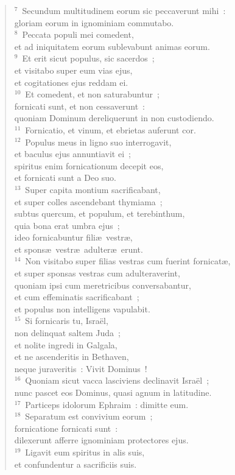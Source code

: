 \begin{verse}
${}^{7}$~Secundum multitudinem eorum sic peccaverunt mihi~:\\ gloriam eorum in ignominiam commutabo.\\
${}^{8}$~Peccata populi mei comedent,\\ et ad iniquitatem eorum sublevabunt animas eorum.\\
${}^{9}$~Et erit sicut populus, sic sacerdos~;\\ et visitabo super eum vias ejus,\\ et cogitationes ejus reddam ei.\\
${}^{10}$~Et comedent, et non saturabuntur~;\\ fornicati sunt, et non cessaverunt~:\\ quoniam Dominum dereliquerunt in non custodiendo.\\
${}^{11}$~Fornicatio, et vinum, et ebrietas auferunt cor.\\
${}^{12}$~Populus meus in ligno suo interrogavit,\\ et baculus ejus annuntiavit ei~;\\ spiritus enim fornicationum decepit eos,\\ et fornicati sunt a Deo suo.\\
${}^{13}$~Super capita montium sacrificabant,\\ et super colles ascendebant thymiama~;\\ subtus quercum, et populum, et terebinthum,\\ quia bona erat umbra ejus~;\\ ideo fornicabuntur fili\ae\ vestr\ae ,\\ et spons\ae\ vestr\ae\ adulter\ae\ erunt.\\
${}^{14}$~Non visitabo super filias vestras cum fuerint fornicat\ae ,\\ et super sponsas vestras cum adulteraverint,\\ quoniam ipsi cum meretricibus conversabantur,\\ et cum effeminatis sacrificabant~;\\ et populus non intelligens vapulabit.\\
${}^{15}$~Si fornicaris tu, Isra\"el,\\ non delinquat saltem Juda~;\\ et nolite ingredi in Galgala,\\ et ne ascenderitis in Bethaven,\\ neque juraveritis~: Vivit Dominus~!\\
${}^{16}$~Quoniam sicut vacca lasciviens declinavit Isra\"el~;\\ nunc pascet eos Dominus, quasi agnum in latitudine.\\
${}^{17}$~Particeps idolorum Ephraim~: dimitte eum.\\
${}^{18}$~Separatum est convivium eorum~;\\ fornicatione fornicati sunt~:\\ dilexerunt afferre ignominiam protectores ejus.\\
${}^{19}$~Ligavit eum spiritus in alis suis,\\ et confundentur a sacrificiis suis.\end{verse}


